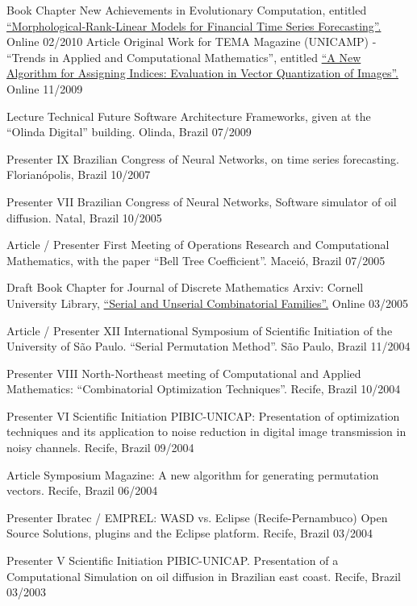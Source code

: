 \begin{cvhonors}

  \cvhonor
    {Book Chapter}
    {New Achievements in Evolutionary Computation, entitled \href{http://www.intechopen.com/books/new-achievements-in-evolutionary-computation/morphological-rank-linear-models-for-financial-time-series-forecasting}{``Morphological-Rank-Linear Models for Financial Time Series Forecasting''.}}
    {Online}
    {02/2010}
  \cvhonor
    {Article}
    {Original Work for TEMA Magazine (UNICAMP) - ``Trends in Applied and Computational Mathematics'', entitled \href{https://tema.sbmac.org.br/tema/article/view/134/75}{``A New Algorithm for Assigning Indices: Evaluation in Vector Quantization of Images''.}}
    {Online}
    {11/2009}

   \cvhonor
   {Lecture}
   {Technical Future Software Architecture Frameworks, given at the ``Olinda Digital'' building.}
   {Olinda, Brazil}
   {07/2009}

   \cvhonor
   {Presenter}
   {IX Brazilian Congress of Neural Networks, on time series forecasting.}
   {Florianópolis, Brazil}
   {10/2007}

   \cvhonor
   {Presenter}
   {VII Brazilian Congress of Neural Networks, Software simulator of oil diffusion.}
   {Natal, Brazil}
   {10/2005}

   \cvhonor
   {Article / Presenter}
   {First Meeting of Operations Research and Computational Mathematics, with the paper ``Bell Tree Coefficient''.}
   {Maceió, Brazil}
   {07/2005}

   \cvhonor
   {Draft Book Chapter for Journal of Discrete Mathematics}
   {Arxiv: Cornell University Library, \href{http://arxiv.org/pdf/math/0503335v1.pdf}{``Serial and Unserial Combinatorial Families''.}}
   {Online}
   {03/2005}

   \cvhonor
   {Article / Presenter}
   {XII International Symposium of Scientific Initiation of the University of São Paulo. ``Serial Permutation Method''.}
   {São Paulo, Brazil}
   {11/2004}

   \cvhonor
   {Presenter}
   {VIII North-Northeast meeting of Computational and Applied Mathematics: ``Combinatorial Optimization Techniques''.}
   {Recife, Brazil}
   {10/2004}

   \cvhonor
   {Presenter}
   {VI Scientific Initiation PIBIC-UNICAP: Presentation of optimization techniques and its application to noise reduction in digital image transmission in noisy channels.}
   {Recife, Brazil}
   {09/2004}

   \cvhonor
   {Article}
   {Symposium Magazine: A new algorithm for generating permutation vectors.}
   {Recife, Brazil}
   {06/2004}

   \cvhonor
   {Presenter}
   {Ibratec / EMPREL: WASD vs. Eclipse (Recife-Pernambuco) Open Source Solutions, plugins and the Eclipse platform.}
   {Recife, Brazil}
   {03/2004}

   \cvhonor
   {Presenter}
   {V Scientific Initiation PIBIC-UNICAP. Presentation of a Computational Simulation on oil diffusion in Brazilian east coast.}
   {Recife, Brazil}
   {03/2003}

\end{cvhonors}
